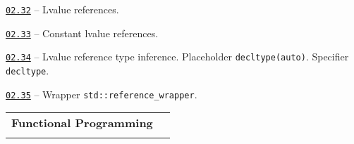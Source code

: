 \documentclass[a4paper,12pt]{article}
\renewenvironment{itemize}
{
    \begin{list}{\labelitemi}
    {
      \setlength{\topsep}{0pt}
      \setlength{\partopsep}{0pt}
      \setlength{\parskip}{0pt}
      \setlength{\itemsep}{0pt}
      \setlength{\parsep}{0pt}
      \setlength{\leftmargin}{14.5pt}
    }
}{\end{list}}
\begin{document}
\medskip\smallskip

\begin{itemize}

    \item \href{https://github.com/i-s-m-mipt/Education/blob/master/projects/examples/source/02.32.cpp}{\texttt{02.32}} -- Lvalue references.

    \smallskip

    \item \href{https://github.com/i-s-m-mipt/Education/blob/master/projects/examples/source/02.33.cpp}{\texttt{02.33}} -- Constant lvalue references.

    \smallskip

    \item \href{https://github.com/i-s-m-mipt/Education/blob/master/projects/examples/source/02.34.cpp}{\texttt{02.34}} -- Lvalue reference type inference. Placeholder \lstinline{decltype(auto)}. Specifier \lstinline{decltype}.

    \smallskip

    \item \href{https://github.com/i-s-m-mipt/Education/blob/master/projects/examples/source/02.35.cpp}{\texttt{02.35}} -- Wrapper \lstinline{std::reference_wrapper}.

\end{itemize}

\bigskip\medskip

\begin{tabular}{!{\vrule width 1pt}L{4.9cm}!{\vrule width 1pt}L{14.1cm}!{\vrule width 0pt}} 


\textbf{Functional Programming} & \\


\end{tabular}

\medskip\smallskip
\end{document}
